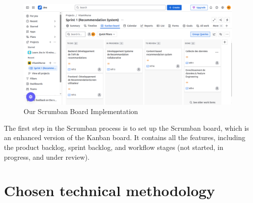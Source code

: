 \begin{center}
\begin{figure}[H]
            \centering
            \includegraphics[scale=0.38]{images/kanbanBoard.png}
            \caption{Our Scrumban Board Implementation}
            \label{fig:Tableau_Scrumban}
\end{figure}
\end{center}

The first step in the Scrumban process is to set up the Scrumban board, which is an enhanced version of the Kanban board. It contains all the features, including the product backlog, sprint backlog, and workflow stages (not started, in progress, and under review).

\section{Chosen technical methodology}

